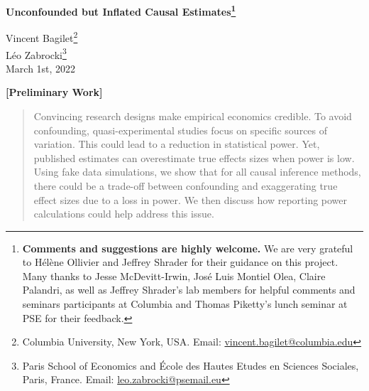 \documentclass[12pt]{article}
\renewcommand{\thefootnote}{\fnsymbol{footnote}}
\begin{document}



\begin{titlepage}
\vspace*{-2cm}
\begin{flushleft}
\Huge{}\selectfont\textbf{Unconfounded but Inflated Causal Estimates\footnote[2]{\textbf{Comments and suggestions are highly welcome.} We are very grateful to Hélène Ollivier and Jeffrey Shrader for their guidance on this project. Many thanks to Jesse McDevitt-Irwin, José Luis Montiel Olea, Claire Palandri, as well as Jeffrey Shrader's lab members for helpful comments and seminars participants at Columbia and Thomas Piketty's lunch seminar at PSE for their feedback.}}
\end{flushleft}
\renewcommand{\thefootnote}{\arabic{footnote}}
\begin{flushleft}
{\large
Vincent Bagilet\footnote{Columbia University, New York, USA. Email: \url{vincent.bagilet@columbia.edu}}\\[3pt] 
Léo Zabrocki\footnote{Paris School of Economics and
École des Hautes Etudes en Sciences Sociales, Paris, France. Email: \url{leo.zabrocki@psemail.eu}}
\\ [0.3cm] 
\normalsize{March 1st, 2022} \\
}

\end{flushleft}
\begin{center}
{\bfseries{}\LARGE  \color{cerulean}[Preliminary Work]}
\end{center}
\begin{abstract}
\noindent Convincing research designs make empirical economics credible. To avoid confounding, quasi-experimental studies focus on specific sources of variation. This could lead to a reduction in statistical power. Yet, published estimates can overestimate true effects sizes when power is low. Using fake data simulations, we show that for all causal inference methods, there could be a trade-off between confounding and exaggerating true effect sizes due to a loss in power. We then discuss how reporting power calculations could help address this issue.

\bigskip
\end{abstract}
\setcounter{page}{0}
\thispagestyle{empty}
\end{titlepage}
\end{document}
